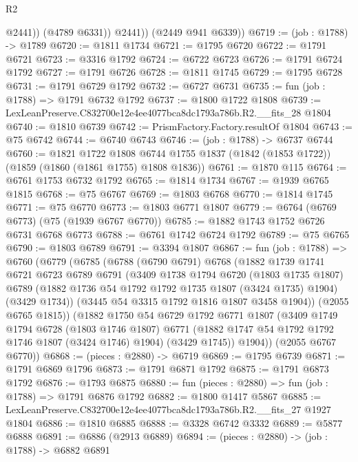 \begin{lexlean}{R2}
\begin{coremodule}
                @2441))
            (@4789 @6331))
          @2441))
      (@2449 @941 @6339))
@6719 := (job : @1788) -> @1789
@6720 := @1811 @1734
@6721 := @1795 @6720
@6722 := @1791 @6721
@6723 := @3316 @1792
@6724 := @6722 @6723
@6726 := @1791 @6724 @1792
@6727 := @1791 @6726
@6728 := @1811 @1745
@6729 := @1795 @6728
@6731 := @1791 @6729 @1792
@6732 := @6727 @6731
@6735 := fun (job : @1788) => @1791 @6732 @1792
@6737 := @1800 @1722 @1808
@6739 := LexLeanPreserve.C832700e12e4ee4077bca8dc1793a786b.R2.__fits_28 @1804
@6740 := @1810 @6739
@6742 := PrismFactory.Factory.resultOf @1804
@6743 := @75 @6742
@6744 := @6740 @6743
@6746 := (job : @1788) -> @6737 @6744
@6760 := @1821
    @1722
    @1808
    @6744
    @1755
    @1837
    (@1842 (@1853 @1722))
    (@1859 (@1860 (@1861 @1755) @1808 @1836))
@6761 := @1870 @115
@6764 := @6761 @1753 @6732 @1792
@6765 := @1814 @1734
@6767 := @1939 @6765 @1815
@6768 := @75 @6767
@6769 := @1803 @6768
@6770 := @1814 @1745
@6771 := @75 @6770
@6773 := @1803 @6771 @1807
@6779 := @6764 (@6769 @6773) (@75 (@1939 @6767 @6770))
@6785 := @1882 @1743 @1752 @6726 @6731 @6768 @6773
@6788 := @6761 @1742 @6724 @1792
@6789 := @75 @6765
@6790 := @1803 @6789
@6791 := @3394 @1807
@6867 := fun (job : @1788) =>
  @6760
    (@6779
      (@6785
        (@6788
          (@6790 @6791)
          @6768
          (@1882
            @1739
            @1741
            @6721
            @6723
            @6789
            @6791
            (@3409
              @1738
              @1794
              @6720
              (@1803 @1735 @1807)
              @6789
              (@1882 @1736 @54 @1792 @1792 @1735 @1807 (@3424 @1735) @1904)
              (@3429 @1734))
            (@3445 @54 @3315 @1792 @1816 @1807 @3458 @1904))
          (@2055 @6765 @1815))
        (@1882
          @1750
          @54
          @6729
          @1792
          @6771
          @1807
          (@3409
            @1749
            @1794
            @6728
            (@1803 @1746 @1807)
            @6771
            (@1882 @1747 @54 @1792 @1792 @1746 @1807 (@3424 @1746) @1904)
            (@3429 @1745))
          @1904))
      (@2055 @6767 @6770))
@6868 := (pieces : @2880) -> @6719
@6869 := @1795 @6739
@6871 := @1791 @6869 @1796
@6873 := @1791 @6871 @1792
@6875 := @1791 @6873 @1792
@6876 := @1793 @6875
@6880 := fun (pieces : @2880) => fun (job : @1788) => @1791 @6876 @1792
@6882 := @1800 @1417 @5867
@6885 := LexLeanPreserve.C832700e12e4ee4077bca8dc1793a786b.R2.__fits_27 @1927 @1804
@6886 := @1810 @6885
@6888 := @3328 @6742 @3332
@6889 := @5877 @6888
@6891 := @6886 (@2913 @6889)
@6894 := (pieces : @2880) -> (job : @1788) -> @6882 @6891

\end{coremodule}
\end{lexlean}
